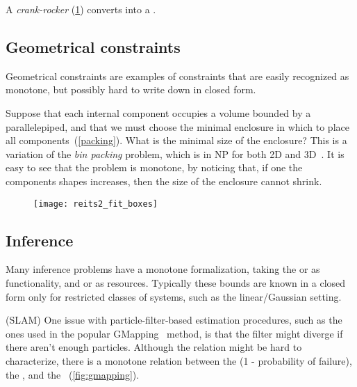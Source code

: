 \begin{example}
  A \emph{crank-rocker} (\cref{fig:crack}) converts  into a .
\end{example}

\begin{figure}[h]
  \centering
  \caption{\label{fig:crack}}
\end{figure}

\subsection{Geometrical constraints}

Geometrical constraints are examples of constraints that are easily
recognized as monotone, but possibly hard to write down in closed
form.

\begin{example}
  Suppose that each internal component occupies a volume
  bounded by a parallelepiped, and that we must choose the minimal enclosure
  in which to place all components~(\cref{packing}). What
  is the minimal size of the enclosure? This is a variation of the \emph{bin
  packing} problem, which is in NP for both 2D and 3D~\cite{lodi02two}.
  It is easy to see that the problem is monotone, by noticing that,
  if one the components shapes increases, then the size of the enclosure
  cannot shrink.
\end{example}

\begin{figure}[h]
  \centering
  \texttt{[image: reits2\_fit\_boxes]}
  \caption{\label{fig:packing}}
\end{figure}

\subsection{Inference}

Many inference problems have a monotone formalization, taking the
 or  as functionality, and 
or  as resources. Typically these bounds are known in
a closed form only for restricted classes of systems, such as the
linear/Gaussian setting.

\begin{example}
  (SLAM) One issue with particle-filter-based estimation procedures,
  such as the ones used in the popular GMapping~\cite{grisetti07improved}
  method, is that the filter might diverge if there aren't enough particles.
  Although the relation might be hard to characterize, there is a monotone
  relation between the  (1 - probability of failure),
  the , and the ~(\cref{fig:gmapping}).
\end{example}


